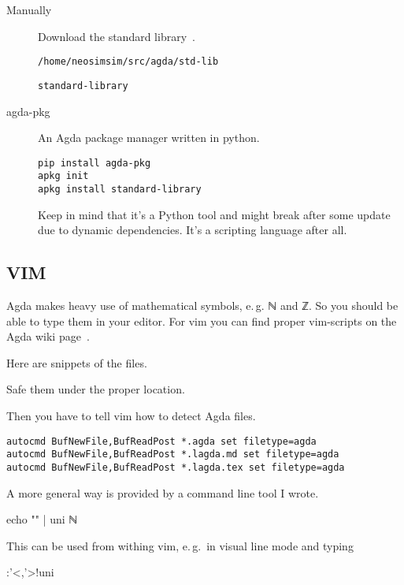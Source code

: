 \documentclass[12pt]{article}
\begin{document}
\begin{description}
	\item[Manually] Download the standard library~\cite{agda-stdlib}.
		\begin{lstlisting}[caption={\$HOME/.agda/libraries}]
/home/neosimsim/src/agda/std-lib
		\end{lstlisting}
		\begin{lstlisting}[caption={\$HOME/.agda/defaults}]
standard-library
		\end{lstlisting}
	\item[agda-pkg] An Agda package manager written in python.
		\begin{lstlisting}
pip install agda-pkg
apkg init
apkg install standard-library
		\end{lstlisting}

		Keep in mind that it's a Python tool and might break after some update
		due to dynamic dependencies. It's a scripting language after all.
\end{description}

\subsection{VIM}

Agda makes heavy use of mathematical symbols, e. g. ℕ and ℤ. So you should be able
to type them in your editor. For vim you can find proper vim-scripts on the
Agda wiki page~\cite{vim-editing}.

Here are snippets of the files.


Safe them under the proper location.

Then you have to tell vim how to detect Agda files.
\begin{lstlisting}[caption={.vim/ftdetect/agda.vim}]
autocmd BufNewFile,BufReadPost *.agda set filetype=agda
autocmd BufNewFile,BufReadPost *.lagda.md set filetype=agda
autocmd BufNewFile,BufReadPost *.lagda.tex set filetype=agda
\end{lstlisting}

A more general way is provided by a command line tool I wrote.

\begin{listing}
echo "\N" | uni
ℕ
\end{listing}

This can be used from withing vim, e. g.\ in visual line mode and typing
\begin{listing}
:'<,'>!uni
\end{listing}
\end{document}
